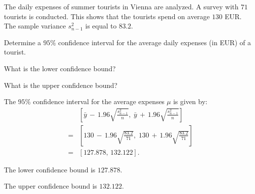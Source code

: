 
\begin{question}
The daily expenses of summer tourists in Vienna are analyzed. A
survey with $71$ tourists is conducted. This shows that the
tourists spend on average $130$ EUR. The sample variance
$s^2_{n-1}$ is equal to $83.2$.

Determine a $95\%$ confidence interval for the average daily
expenses (in EUR) of a tourist.

\begin{answerlist}
\item What is the lower confidence bound?
\item What is the upper confidence bound?
\end{answerlist}
\end{question}

\begin{solution}
The $95\%$ confidence interval for the average expenses $\mu$ is
given by:
\begin{eqnarray*}
&   & \left[\bar{y} \, - \, 1.96\sqrt{\frac{s_{n-1}^2}{n}}, \; 
  \bar{y} \, + \, 1.96\sqrt{\frac{s_{n-1}^2}{n}}\right] \\
& = & \left[ 130 \, - \, 1.96\sqrt{\frac{83.2}{71}}, \;
             130 \, + \, 1.96\sqrt{\frac{83.2}{71}}\right] \\
& = & \left[127.878, \, 132.122\right].
\end{eqnarray*}

\begin{answerlist}
\item The lower confidence bound is $127.878$.
\item The upper confidence bound is $132.122$.
\end{answerlist}
\end{solution}

